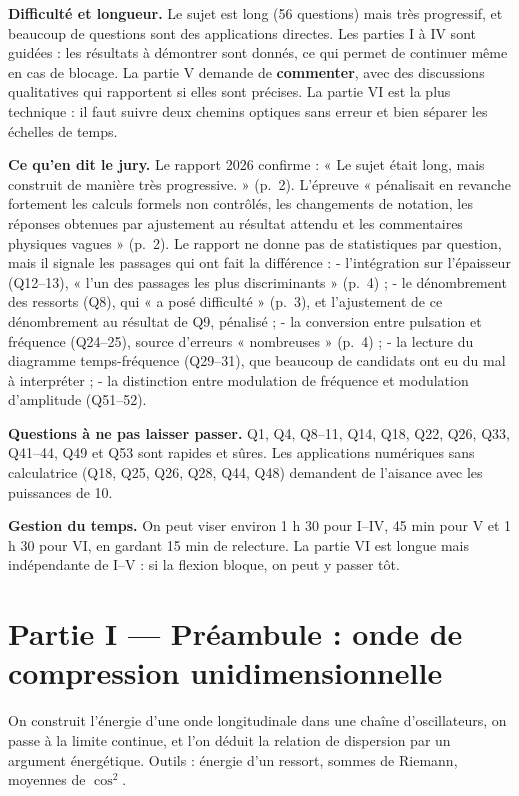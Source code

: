 \documentclass[11pt,a4paper]{article}
\begin{document}
\textbf{Difficulté et longueur.} Le sujet est long (56 questions) mais très progressif, et beaucoup de questions sont des applications directes. Les parties I à IV sont guidées : les résultats à démontrer sont donnés, ce qui permet de continuer même en cas de blocage. La partie V demande de \textbf{commenter}, avec des discussions qualitatives qui rapportent si elles sont précises. La partie VI est la plus technique : il faut suivre deux chemins optiques sans erreur et bien séparer les échelles de temps.

\textbf{Ce qu'en dit le jury.} Le rapport 2026 confirme : « Le sujet était long, mais construit de manière très progressive. » (p.~2). L'épreuve « pénalisait en revanche fortement les calculs formels non contrôlés, les changements de notation, les réponses obtenues par ajustement au résultat attendu et les commentaires physiques vagues » (p.~2). Le rapport ne donne pas de statistiques par question, mais il signale les passages qui ont fait la différence :
- l'intégration sur l'épaisseur (Q12--13), « l'un des passages les plus discriminants » (p.~4) ;
- le dénombrement des ressorts (Q8), qui « a posé difficulté » (p.~3), et l'ajustement de ce dénombrement au résultat de Q9, pénalisé ;
- la conversion entre pulsation et fréquence (Q24--25), source d'erreurs « nombreuses » (p.~4) ;
- la lecture du diagramme temps-fréquence (Q29--31), que beaucoup de candidats ont eu du mal à interpréter ;
- la distinction entre modulation de fréquence et modulation d'amplitude (Q51--52).

\textbf{Questions à ne pas laisser passer.} Q1, Q4, Q8--11, Q14, Q18, Q22, Q26, Q33, Q41--44, Q49 et Q53 sont rapides et sûres. Les applications numériques sans calculatrice (Q18, Q25, Q26, Q28, Q44, Q48) demandent de l'aisance avec les puissances de 10.

\textbf{Gestion du temps.} On peut viser environ 1 h 30 pour I--IV, 45 min pour V et 1 h 30 pour VI, en gardant 15 min de relecture. La partie VI est longue mais indépendante de I--V : si la flexion bloque, on peut y passer tôt.

\hypertarget{partie-i-pruxe9ambule-onde-de-compression-unidimensionnelle}{%
\section{Partie I --- Préambule : onde de compression unidimensionnelle}\label{partie-i-pruxe9ambule-onde-de-compression-unidimensionnelle}}

On construit l'énergie d'une onde longitudinale dans une chaîne d'oscillateurs, on passe à la limite continue, et l'on déduit la relation de dispersion par un argument énergétique. Outils : énergie d'un ressort, sommes de Riemann, moyennes de \(\cos^2\).
\end{document}

